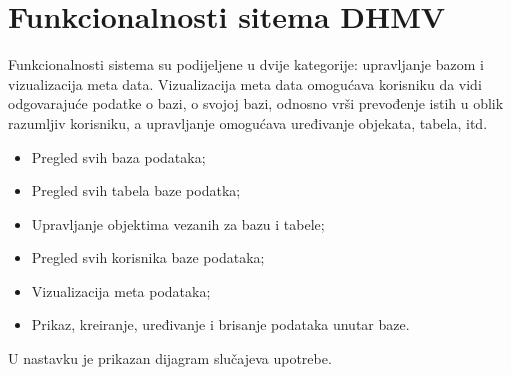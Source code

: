 \documentclass[12pt, a4paper]{report}
\theoremstyle{definition}
\begin{document}
\section{Funkcionalnosti sitema DHMV}


Funkcionalnosti sistema su podijeljene u dvije kategorije: upravljanje bazom i vizualizacija meta data. Vizualizacija meta data omogućava korisniku da vidi odgovarajuće podatke o bazi, o svojoj bazi, odnosno vrši prevođenje istih u oblik razumljiv korisniku, a upravljanje omogućava uređivanje objekata, tabela, itd.

\begin{itemize}
	\item Pregled svih baza podataka;
	\item Pregled svih tabela baze podatka;
	\item Upravljanje objektima vezanih za bazu i tabele;
	\item Pregled svih korisnika baze podataka;
	\item Vizualizacija meta podataka;
	\item Prikaz, kreiranje, uređivanje i brisanje podataka unutar baze.
\end{itemize}

U nastavku je prikazan dijagram slučajeva upotrebe.
\end{document}
